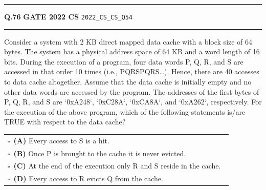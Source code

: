 \documentclass[a4paper,10pt]{article}
\begin{document}
\vspace{6pt}\hrule height 0.35pt\vspace{6pt}
\noindent
\begin{tcolorbox}[
    blanker,
    sidebyside,
    sidebyside align=top,
    lefthand width=0.55\textwidth,
    top=4pt, bottom=4pt, left=0pt, right=0pt,
    middle=16pt,
    underlay={
        \draw[dashed, black!80, line width=0.8pt, dash pattern=on 4pt off 3pt]
            ([xshift=0.55\textwidth+8pt]frame.north west) --
            ([xshift=0.55\textwidth+8pt]frame.south west);
    }
]
\textbf{Q.76}  \hfill {\footnotesize\textbf{GATE 2022 CS} \quad \tiny\texttt{2022\_CS\_CS\_Q54}}
\vspace{2pt}\hrule height 0.3pt\vspace{4pt}

Consider a system with 2 KB direct mapped data cache with a block size of 64 bytes. The system has a physical address space of 64 KB and a word length of 16 bits. During the execution of a program, four data words P, Q, R, and S are accessed in that order 10 times (i.e., PQRSPQRS\dots). Hence, there are 40 accesses to data cache altogether. Assume that the data cache is initially empty and no other data words are accessed by the program. The addresses of the first bytes of P, Q, R, and S are `0xA248`, `0xC28A`, `0xCA8A`, and `0xA262`, respectively. For the execution of the above program, which of the following statements is/are TRUE with respect to the data cache?

\par\vspace{6pt}\noindent
\begin{tabular}{@{}p{0.98\linewidth}@{}}
$\square$\ \textbf{(A)} Every access to S is a hit. \\
\addlinespace[3pt]
$\square$\ \textbf{(B)} Once P is brought to the cache it is never evicted. \\
\addlinespace[3pt]
$\square$\ \textbf{(C)} At the end of the execution only R and S reside in the cache. \\
\addlinespace[3pt]
$\square$\ \textbf{(D)} Every access to R evicts Q from the cache.
\end{tabular}

\tcblower


\end{tcolorbox}
\end{document}
